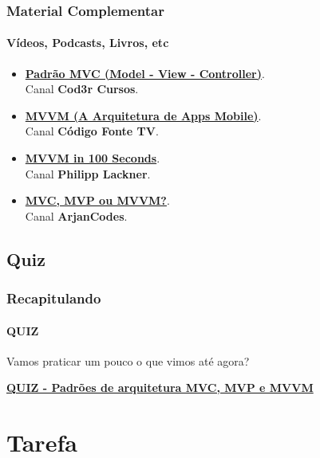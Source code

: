 \documentclass[
	9pt, %
	t, %
]{beamer}
\newcommand{\iconLink}[2]{\href{#1}{\faLink \hspace{0.2em} {#2}}}
\begin{document}
\begin{frame}
	\frametitle{Material Complementar}
	\framesubtitle{Vídeos, Podcasts, Livros, etc}
	
	\begin{itemize}
		\item \iconLink{https://youtu.be/mMDt9g7bMjk}{\textbf{Padrão MVC (Model - View - Controller)}}.\\Canal \textbf{Cod3r Cursos}.\\
		\item \iconLink{https://youtu.be/B2pJWtSyVFA}{\textbf{MVVM (A Arquitetura de Apps Mobile)}}.\\Canal \textbf{Código Fonte TV}.\\
		\item \iconLink{https://www.youtube.com/watch?v=-xTqfilaYow}{\textbf{MVVM in 100 Seconds}}.\\Canal \textbf{Philipp Lackner}.\\
		\item \iconLink{https://www.youtube.com/watch?v=eHhXoCNCI1c}{\textbf{MVC, MVP ou MVVM?}}.\\Canal \textbf{ArjanCodes}.\\
	\end{itemize}
	
\end{frame}

\subsection{Quiz}

\begin{frame}
	\frametitle{Recapitulando}
	\framesubtitle{QUIZ}

	Vamos praticar um pouco o que vimos até agora?
	\vfill

	\bigskip
	\centering

	\iconLink{https://quizizz.com/admin/quiz/659d7e449a88c830fdf1801c?source=quiz_share}{\textbf{QUIZ - Padrões de arquitetura MVC, MVP e MVVM}}
	\vfill
		
\end{frame}


\section{Tarefa}
\end{document}

